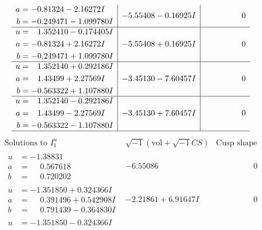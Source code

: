 \documentclass[1p]{elsarticle_modified}
\theoremstyle{definition}
\newcommand{\I}{\sqrt{-1}}
\begin{document}
$$\begin{array}{c|c|c}
\begin{aligned}
a &= -0.81324 - 2.16272 I \\
b &= -0.249471 - 1.099780 I\end{aligned}
 & -5.55408 - 0.16925 I & \phantom{-0.000000 } 0 \\ \hline\begin{aligned}
u &= \phantom{-}1.352410 - 0.174405 I \\
a &= -0.81324 + 2.16272 I \\
b &= -0.249471 + 1.099780 I\end{aligned}
 & -5.55408 + 0.16925 I & \phantom{-0.000000 } 0 \\ \hline\begin{aligned}
u &= \phantom{-}1.352140 + 0.292186 I \\
a &= \phantom{-}1.43499 + 2.27569 I \\
b &= -0.563322 + 1.107880 I\end{aligned}
 & -3.45130 - 7.60457 I & \phantom{-0.000000 } 0 \\ \hline\begin{aligned}
u &= \phantom{-}1.352140 - 0.292186 I \\
a &= \phantom{-}1.43499 - 2.27569 I \\
b &= -0.563322 - 1.107880 I\end{aligned}
 & -3.45130 + 7.60457 I & \phantom{-0.000000 } 0\\
 \hline 
 \end{array}$$\newpage$$\begin{array}{c|c|c}  
\text{Solutions to }I^u_{1}& \I (\text{vol} + \sqrt{-1}CS) & \text{Cusp shape}\\
 \hline 
\begin{aligned}
u &= -1.38831\phantom{ +0.000000I} \\
a &= \phantom{-}0.567618\phantom{ +0.000000I} \\
b &= \phantom{-}0.720202\phantom{ +0.000000I}\end{aligned}
 & -6.55086\phantom{ +0.000000I} & \phantom{-0.000000 } 0 \\ \hline\begin{aligned}
u &= -1.351850 + 0.324366 I \\
a &= \phantom{-}0.391496 + 0.542908 I \\
b &= \phantom{-}0.791439 - 0.364830 I\end{aligned}
 & -2.21861 + 6.91647 I & \phantom{-0.000000 } 0 \\ \hline\begin{aligned}
u &= -1.351850 - 0.324366 I \\

\end{aligned}
\end{array}$$
\end{document}
